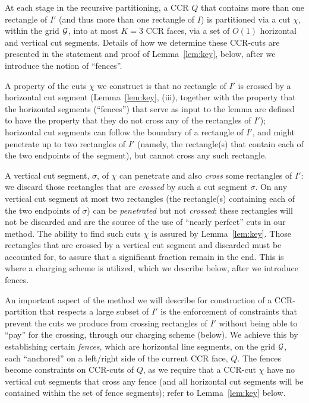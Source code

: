 \documentclass{article}
\begin{document}
At each stage in the recursive partitioning, a CCR $Q$ that contains
more than one rectangle of $I'$ (and thus more than one rectangle of
$I$) is partitioned via a cut $\chi$, within the grid ${\cal G}$, into
at most $K=3$ CCR faces, via a set of $O(1)$ horizontal and vertical
cut segments. Details of how we determine these CCR-cuts are presented
in the statement and proof of Lemma~\ref{lem:key}, below, after we
introduce the notion of ``fences''.

A property of the cuts $\chi$ we construct is that no rectangle of
$I'$ is crossed by a horizontal cut segment (Lemma~\ref{lem:key},
(iii), together with the property that the horizontal segments
(``fences'') that serve as input to the lemma are defined to have the
property that they do not cross any of the rectangles of $I'$);
horizontal cut segments can follow the boundary of a rectangle of
$I'$, and might penetrate up to two rectangles of $I'$ (namely, the rectangle(s) 
that contain each of the two endpoints of the segment), but cannot cross
any such rectangle.

A vertical cut segment, $\sigma$, of $\chi$ can penetrate and also
{\em cross} some rectangles of $I'$: we discard those rectangles that
are {\em crossed} by such a cut segment $\sigma$. On any vertical cut
segment at most two rectangles (the rectangle(s) containing each of
the two endpoints of $\sigma$) can be {\em penetrated} but not {\em
  crossed}; these rectangles will not be discarded and are the source
of the use of ``nearly perfect'' cuts in our method.  The ability to
find such cuts $\chi$ is assured by Lemma~\ref{lem:key}.  Those
rectangles that are crossed by a vertical cut segment and discarded
must be accounted for, to assure that a significant fraction remain in
the end.  This is where a charging scheme is utilized, which we
describe below, after we introduce fences.

\medskip
{}\quad
An important aspect of the method we will describe for construction of
a CCR-partition that respects a large subset of $I'$ is the
enforcement of constraints that prevent the cuts we produce from
crossing rectangles of $I'$ without being able to ``pay'' for the crossing,
through our charging scheme (below).  We achieve this by establishing
certain {\em fences}, which are horizontal line segments, on the grid
${\cal G}$, each ``anchored'' on a left/right side of the current CCR
face, $Q$. The fences become constraints on CCR-cuts of $Q$, as we
require that a CCR-cut $\chi$ have no vertical cut segments that cross
any fence (and all horizontal cut segments will be contained within the
set of fence segments); refer to Lemma~\ref{lem:key} below.
\end{document}
